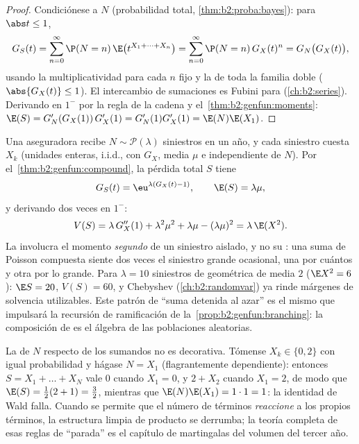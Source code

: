 \begin{proof}
Condiciónese a $N$ (probabilidad total,
\cref{thm:b2:proba:bayes}): para $\abs t \leq 1$,
\[
G_S(t) = \sum_{n=0}^\infty \P(N = n)\,
\E\bigl(t^{X_1 + \dots + X_n}\bigr)
= \sum_{n=0}^\infty \P(N = n)\,G_X(t)^n
= G_N\bigl(G_X(t)\bigr),
\]
usando la multiplicatividad para cada $n$ fijo y la  de
toda la familia doble ($\abs{G_X(t)} \leq 1$). El intercambio de
sumaciones es Fubini para 
(\cref{ch:b2:series}). Derivando en $1^-$ por la regla de la cadena y
el~\cref{thm:b2:genfun:moments}: $\E(S) = G_N'(G_X(1))\,G_X'(1) =
G_N'(1)G_X'(1) = \E(N)\E(X_1)$.
\end{proof}

\begin{example}\label{ex:b2:genfun:compoundpoisson}
Una aseguradora recibe $N \sim \mathcal P(\lambda)$ siniestros en un
año, y cada siniestro cuesta $X_k$ (unidades enteras, i.i.d., con
 $G_X$, media $\mu$ e independiente de $N$). Por el~\cref{thm:b2:genfun:compound}, la pérdida total $S$ tiene
\[
G_S(t) = \eu^{\lambda(G_X(t) - 1)},
\qquad
\E(S) = \lambda\mu ,
\]
y derivando dos veces en $1^-$:
\[
V(S) = \lambda\,G_X''(1) + \lambda^2\mu^2 + \lambda\mu -
(\lambda\mu)^2 = \lambda\,\E(X^2) .
\]
La  involucra el momento \emph{segundo} de un siniestro
aislado, y no su : una suma de Poisson compuesta siente dos
veces el siniestro grande ocasional, una por cuántos y otra por lo
grande. Para $\lambda = 10$ siniestros de  geométrica de media
$2$ ($\E X^2 = 6$): $\E S = 20$, $V(S) = 60$, y Chebyshev
(\cref{ch:b2:randomvar}) ya rinde márgenes de solvencia utilizables.
Este patrón de ``suma detenida al azar'' es el mismo que impulsará la
recursión de ramificación de la~\cref{prop:b2:genfun:branching}: la composición de
 es el álgebra de las poblaciones aleatorias.
\end{example}

\begin{remark}
La  de $N$ respecto de los sumandos no es decorativa.
Tómense $X_k \in \{0, 2\}$ con igual probabilidad y hágase $N = X_1$
(flagrantemente dependiente): entonces $S = X_1 + \dots + X_N$ vale
$0$ cuando $X_1 = 0$, y $2 + X_2$ cuando $X_1 = 2$, de modo que
$\E(S) = \frac12(2 + 1) = \frac32$, mientras que $\E(N)\E(X_1) =
1\cdot1 = 1$: la identidad de Wald falla. Cuando se permite que el
número de términos \emph{reaccione} a los propios términos, la
estructura limpia de producto se derrumba; la teoría completa de esas
reglas de ``parada'' es el capítulo de martingalas del volumen del
tercer año.
\end{remark}

